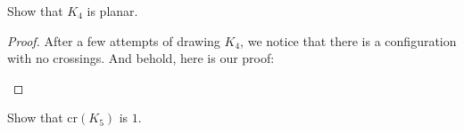 \documentclass[11pt,paper=letter]{scrartcl}
\newcommand{\crs}[1]{\mathrm{cr}(#1)}
\begin{document}
\begin{problem}
Show that $K_4$ is planar.
\end{problem}

\begin{proof}
After a few attempts of drawing $K_4$, we notice that there is a configuration with no crossings. And behold, here is our proof:

\begin{center}
\end{center}
\end{proof}

\begin{problem}
Show that $\crs{K_5}$ is $1$.
\end{problem}
\end{document}
